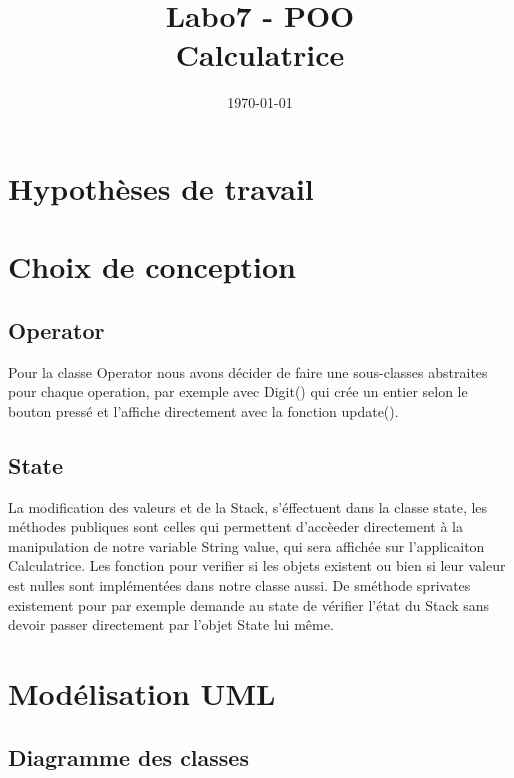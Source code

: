\documentclass[12pt, a4paper, onecolumn]{article}
\title{Labo7 - POO \\ Calculatrice}
\author{
	\authorstyle{Dani Tiago \largename{Faria dos Santos}\\ Antoine \largename{Aubry } \\ \\ Groupe  \textbf{L02GrP}\\ HEIG-VD} %
}
\date{\today}
\begin{document}
	\twocolumn[ 
	\maketitle
	]
	
	\onecolumn 
	
	\tableofcontents
	\newpage
	
	\section{Hypothèses de travail}
	
	\section{Choix de conception}
	\subsection{Operator}
	Pour la classe Operator nous avons décider de faire une sous-classes abstraites pour chaque operation, par exemple avec Digit() qui crée un entier selon le bouton pressé et l'affiche directement avec la fonction update().
	
	\subsection{State}
	La modification des valeurs et de la Stack, s'éffectuent dans la classe state, les méthodes publiques sont celles qui permettent d'accèeder directement à la manipulation de notre variable String value, qui sera affichée sur l'applicaiton Calculatrice. Les fonction pour verifier si les objets existent ou bien si leur valeur est nulles sont implémentées dans notre classe aussi. De sméthode sprivates existement pour par exemple demande au state de vérifier l'état du Stack sans devoir passer directement par l'objet State lui même.
	
	\section{Modélisation UML}
	\subsection{Diagramme des classes}

	
	
\end{document}

